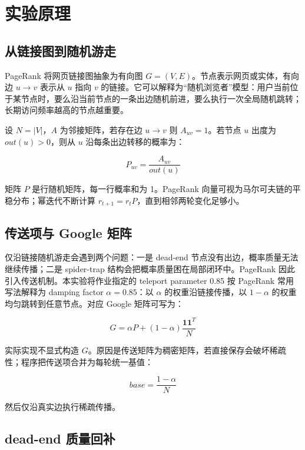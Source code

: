 \documentclass[UTF8,a4paper,10pt]{ctexart}
\newcommand{\xiaosi}{\fontsize{12pt}{20pt}\selectfont}
\begin{document}
\section{实验原理}
\xiaosi

\subsection{从链接图到随机游走}

PageRank 将网页链接图抽象为有向图 $G=(V,E)$。节点表示网页或实体，有向边 $u\rightarrow v$ 表示从 $u$ 指向 $v$ 的链接。它可以解释为“随机浏览者”模型：用户当前位于某节点时，要么沿当前节点的一条出边随机前进，要么执行一次全局随机跳转；长期访问频率越高的节点越重要。

设 $N=|V|$，$A$ 为邻接矩阵，若存在边 $u\rightarrow v$ 则 $A_{uv}=1$。若节点 $u$ 出度为 $out(u)>0$，则从 $u$ 沿每条出边转移的概率为：

\begin{equation}
P_{uv}=\frac{A_{uv}}{out(u)}
\end{equation}

矩阵 $P$ 是行随机矩阵，每一行概率和为 1。PageRank 向量可视为马尔可夫链的平稳分布；幂迭代不断计算 $r_{t+1}=r_tP$，直到相邻两轮变化足够小。

\subsection{传送项与 Google 矩阵}

仅沿链接随机游走会遇到两个问题：一是 dead-end 节点没有出边，概率质量无法继续传播；二是 spider-trap 结构会把概率质量困在局部闭环中。PageRank 因此引入传送机制。本实验将作业指定的 teleport parameter 0.85 按 PageRank 常用写法解释为 damping factor $\alpha=0.85$：以 $\alpha$ 的权重沿链接传播，以 $1-\alpha$ 的权重均匀跳转到任意节点。对应 Google 矩阵可写为：

\begin{equation}
G=\alpha P + (1-\alpha)\frac{\mathbf{1}\mathbf{1}^{T}}{N}
\end{equation}

实际实现不显式构造 $G$。原因是传送矩阵为稠密矩阵，若直接保存会破坏稀疏性；程序把传送项合并为每轮统一基值：

\begin{equation}
base=\frac{1-\alpha}{N}
\end{equation}

然后仅沿真实边执行稀疏传播。

\subsection{dead-end 质量回补}
\end{document}
